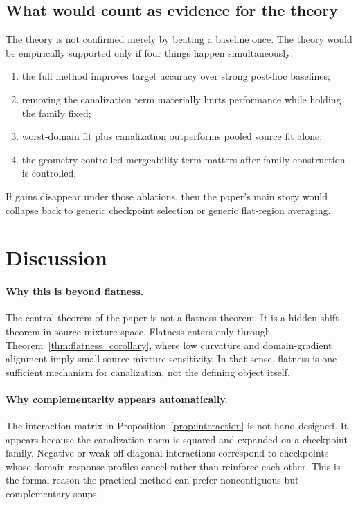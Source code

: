 \documentclass{article}
\theoremstyle{definition}
\begin{document}
\subsection{What would count as evidence for the theory}

The theory is not confirmed merely by beating a baseline once. The theory would be empirically supported only if four things happen simultaneously:
\begin{enumerate}[leftmargin=1.3em]
    \item the full method improves target accuracy over strong post-hoc baselines;
    \item removing the canalization term materially hurts performance while holding the family fixed;
    \item worst-domain fit plus canalization outperforms pooled source fit alone;
    \item the geometry-controlled mergeability term matters after family construction is controlled.
\end{enumerate}
If gains disappear under those ablations, then the paper's main story would collapse back to generic checkpoint selection or generic flat-region averaging.

\section{Discussion}
\label{sec:discussion}

\paragraph{Why this is beyond flatness.}
The central theorem of the paper is not a flatness theorem. It is a hidden-shift theorem in source-mixture space. Flatness enters only through Theorem~\ref{thm:flatness_corollary}, where low curvature and domain-gradient alignment imply small source-mixture sensitivity. In that sense, flatness is one sufficient mechanism for canalization, not the defining object itself.

\paragraph{Why complementarity appears automatically.}
The interaction matrix in Proposition~\ref{prop:interaction} is not hand-designed. It appears because the canalization norm is squared and expanded on a checkpoint family. Negative or weak off-diagonal interactions correspond to checkpoints whose domain-response profiles cancel rather than reinforce each other. This is the formal reason the practical method can prefer noncontiguous but complementary soups.
\end{document}
